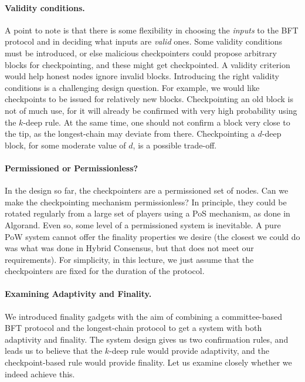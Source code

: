 \documentclass{article}
\begin{document}
\paragraph{Validity conditions.} A point to note is that there is some flexibility in choosing the \textit{inputs} to the BFT protocol and in deciding what inputs are \textit{valid} ones. Some validity conditions must be introduced, or else malicious checkpointers could propose arbitrary blocks for checkpointing, and these might get checkpointed. A validity criterion would help honest nodes ignore invalid blocks. Introducing the right validity conditions is a challenging design question. For example, we would like checkpoints to be issued for relatively new blocks. Checkpointing an old block is not of much use, for it will already be confirmed with very high probability using the $k$-deep rule. At the same time, one should not confirm a block very close to the tip, as the longest-chain may deviate from there. Checkpointing a $d$-deep block, for some moderate value of $d$, is a possible trade-off.

\paragraph{Permissioned or Permissionless?} In the design so far, the checkpointers are a permissioned set of nodes. Can we make the checkpointing mechanism permissionless? In principle, they could be rotated regularly from a large set of players using a PoS mechanism, as done in Algorand. Even so, some level of a permissioned system is inevitable. A pure PoW system cannot offer the finality properties we desire (the closest we could do was what was done in {\sf Hybrid Consensus}, but that does not meet our requirements). For simplicity, in this lecture, we just assume that the checkpointers are fixed for the duration of the protocol. 

\paragraph{Examining Adaptivity and Finality.}
We introduced finality gadgets with the aim of combining a committee-based BFT protocol and the longest-chain protocol to get a system with both adaptivity and finality. The system design gives us two confirmation rules, and leads us to believe that the $k$-deep rule would provide adaptivity, and the checkpoint-based rule would provide finality. Let us examine closely whether we indeed achieve this. 
\end{document}
